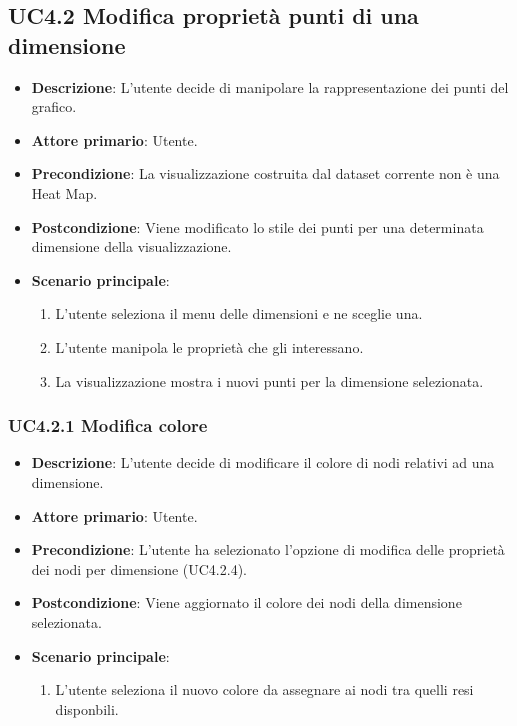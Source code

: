 \subsection{UC4.2 Modifica proprietà punti di una dimensione}
\label{subsec:uc4.2}
\begin{itemize}
    \item \textbf{Descrizione}: L’utente decide di manipolare la rappresentazione dei punti del grafico.
	
    \item \textbf{Attore primario}: Utente.
    
    \item \textbf{Precondizione}:   La visualizzazione costruita dal dataset corrente non è una Heat Map.

    \item \textbf{Postcondizione}:  Viene modificato lo stile dei punti per una determinata dimensione della visualizzazione.

	\item \textbf{Scenario principale}:
        \begin{enumerate}
        
            \item L'utente seleziona il menu delle dimensioni e ne sceglie una.
            \item L'utente manipola le proprietà che gli interessano.
            \item La visualizzazione mostra i nuovi punti per la dimensione selezionata.
                
        \end{enumerate}
\end{itemize}


\subsubsection{UC4.2.1 Modifica colore}
\label{subsec:uc4.2.1}
\begin{itemize}
    \item \textbf{Descrizione}: L'utente decide di modificare il colore di nodi relativi ad una dimensione.

	
    \item \textbf{Attore primario}: Utente.
    
    \item \textbf{Precondizione}:   L'utente ha selezionato l'opzione di modifica delle proprietà dei nodi per dimensione (UC4.2.4).
    \item \textbf{Postcondizione}:  Viene aggiornato il colore dei nodi della dimensione selezionata.

	\item \textbf{Scenario principale}:
        \begin{enumerate}
            \item L'utente seleziona il nuovo colore da assegnare ai nodi tra quelli resi disponbili.
        \end{enumerate}
\end{itemize}

